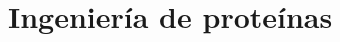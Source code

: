 % 
% 
% 
% 
% 
% 














































\section{Ingeniería de proteínas}
\label{proteinEngineering}





